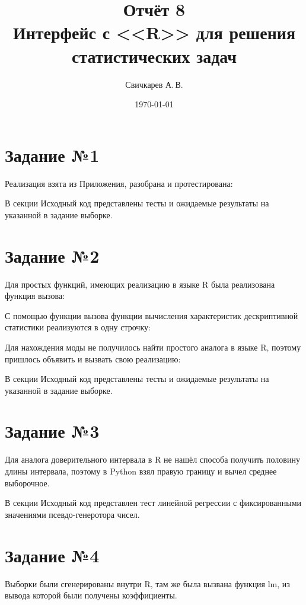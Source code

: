 \documentclass{article} %
\title{Отчёт 8\protect\\Интерфейс с <<R>> для решения статистических задач} %
\author{Свичкарев А.\,В.} %
\date{\today} %
\begin{document}

\maketitle %

\section{Задание №1}
Реализация взята из Приложения, разобрана и протестирована:
%

В секции Исходный код представлены тесты и ожидаемые результаты на указанной в задание выборке.

\section{Задание №2}
Для простых функций, имеющих реализацию в языке R была реализована функция вызова:
%

С помощью функции вызова функции вычисления характеристик дескриптивной статистики реализуются в одну строчку:
%

Для нахождения моды не получилось найти простого аналога в языке R, поэтому пришлось объявить и вызвать свою реализацию:
%

В секции Исходный код представлены тесты и ожидаемые результаты на указанной в задание выборке.

\section{Задание №3}
Для аналога доверительного интервала в R не нашёл способа получить половину длины интервала, поэтому в Python взял правую границу и вычел среднее выборочное.

%

В секции Исходный код представлен тест линейной регрессии с фиксированными значениями псевдо-генеротора чисел.

\section{Задание №4}
Выборки были сгенерированы внутри R, там же была вызвана функция lm, из вывода которой были получены коэффициенты.
\newpage
%
\end{document}
